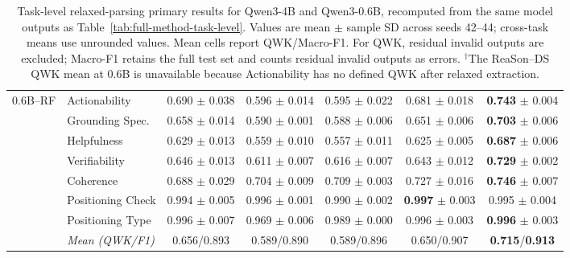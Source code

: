 \begin{table}[!tp]
{\begin{tabular*}{\textwidth}{@{\extracolsep{\fill}}clccccc@{}}
\multirow{8}{*}{0.6B--RF}
& Actionability & 0.690 $\pm$ 0.038 & 0.596 $\pm$ 0.014 & 0.595 $\pm$ 0.022 & 0.681 $\pm$ 0.018 & \textbf{0.743} $\pm$ 0.004 \\
& Grounding Spec. & 0.658 $\pm$ 0.014 & 0.590 $\pm$ 0.001 & 0.588 $\pm$ 0.006 & 0.651 $\pm$ 0.006 & \textbf{0.703} $\pm$ 0.006 \\
& Helpfulness & 0.629 $\pm$ 0.013 & 0.559 $\pm$ 0.010 & 0.557 $\pm$ 0.011 & 0.625 $\pm$ 0.005 & \textbf{0.687} $\pm$ 0.006 \\
& Verifiability & 0.646 $\pm$ 0.013 & 0.611 $\pm$ 0.007 & 0.616 $\pm$ 0.007 & 0.643 $\pm$ 0.012 & \textbf{0.729} $\pm$ 0.002 \\
\cmidrule(lr){2-7}
& Coherence & 0.688 $\pm$ 0.029 & 0.704 $\pm$ 0.009 & 0.709 $\pm$ 0.003 & 0.727 $\pm$ 0.016 & \textbf{0.746} $\pm$ 0.007 \\
& Positioning Check & 0.994 $\pm$ 0.005 & 0.996 $\pm$ 0.001 & 0.990 $\pm$ 0.002 & \textbf{0.997} $\pm$ 0.003 & 0.995 $\pm$ 0.004 \\
& Positioning Type & 0.996 $\pm$ 0.007 & 0.969 $\pm$ 0.006 & 0.989 $\pm$ 0.000 & 0.996 $\pm$ 0.003 & \textbf{0.996} $\pm$ 0.003 \\
& \textit{Mean (QWK/F1)} & 0.656/0.893 & 0.589/0.890 & 0.589/0.896 & 0.650/0.907 & \textbf{0.715}/\textbf{0.913} \\
\bottomrule
\end{tabular*}
}

\caption{Task-level relaxed-parsing primary results for Qwen3-4B and
Qwen3-0.6B, recomputed from the same model outputs as
Table~\ref{tab:full-method-task-level}. Values are mean $\pm$ sample SD
across seeds 42--44; cross-task means use unrounded values. Mean cells report
QWK/Macro-F1. For QWK, residual invalid outputs are excluded; Macro-F1 retains
the full test set and counts residual invalid outputs as errors.
$^{\dagger}$The ReaSon--DS QWK mean at 0.6B is unavailable because
Actionability has no defined QWK after relaxed extraction.}
\label{tab:full-method-task-level-relaxed}
\end{table}
